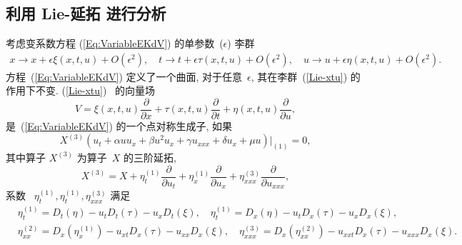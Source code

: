 \subsection{利用 Lie-延拓 进行分析}
考虑变系数方程 (\ref{Eq:VariableEKdV}) 的单参数~($\epsilon$) 李群
\begin{align}\label{Lie-xtu}
x\rightarrow x+\epsilon \xi(x,t,u)+O(\epsilon^2),\quad t\rightarrow t+\epsilon \tau(x,t,u)+O(\epsilon^2),\quad u\rightarrow u+\epsilon \eta(x,t,u)+O(\epsilon^2).
\end{align}
方程~(\ref{Eq:VariableEKdV}) 定义了一个曲面, 对于任意~$\epsilon$, 其在李群~(\ref{Lie-xtu}) 的作用下不变.
(\ref{Lie-xtu})~ 的向量场
\begin{equation}\label{Lie-generator}
V=\xi(x,t,u)\frac{\partial}{\partial x}+\tau(x,t,u)\frac{\partial}{\partial t}+\eta(x,t,u)\frac{\partial}{\partial u},
\end{equation}
是~(\ref{Eq:VariableEKdV}) 的一个点对称生成子, 如果
\begin{equation}\label{Eq:O-VariableEKdV}
X^{(3)}(u_t+\alpha uu_x+\beta u^2u_x+\gamma u_{xxx}+\delta u_x+\mu u)|_{(1)}=0,
\end{equation}
其中算子 $X^{(3)}$ 为算子~$X$ 的三阶延拓,
\begin{equation}
X^{(3)}=X+\eta_t^{(1)}\frac{\partial}{\partial u_t}+\eta_x^{(1)}\frac{\partial}{\partial u_x}+\eta_{xxx}^{(3)}\frac{\partial}{\partial u_{xxx}},
\end{equation}
系数~ $\eta_t^{(1)}, \eta_t^{(1)}, \eta_{xxx}^{(3)}$ 满足
\begin{align*}
&\eta_t^{(1)}=D_t(\eta)-u_tD_t(\tau)-u_xD_t(\xi),\quad \eta_t^{(1)}=D_x(\eta)-u_tD_x(\tau)-u_xD_x(\xi),\\
&\eta_{xx}^{(2)}=D_x(\eta_x^{(1)})-u_{xt}D_x(\tau)-u_{xx}D_x(\xi),\quad \eta_{xxx}^{(3)}=D_x(\eta_{xx}^{(2)})-u_{xxt}D_x(\tau)-u_{xxx}D_x(\xi).
\end{align*}

